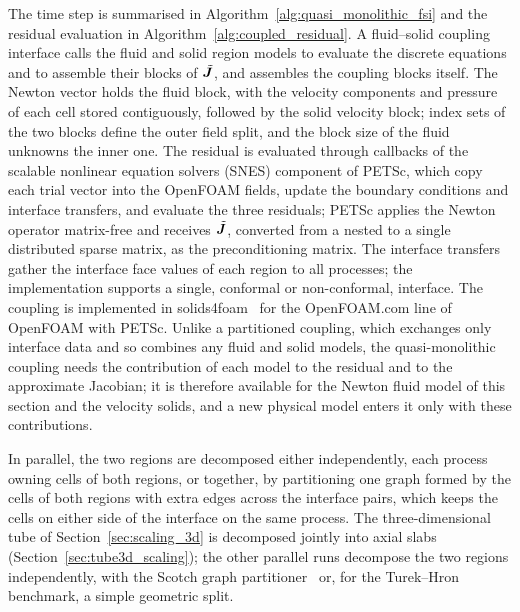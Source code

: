 The time step is summarised in Algorithm~\ref{alg:quasi_monolithic_fsi} and the residual evaluation in Algorithm~\ref{alg:coupled_residual}.
A fluid--solid coupling interface calls the fluid and solid region models to evaluate the discrete equations and to assemble their blocks of $\tilde{\boldsymbol{J}}$, and assembles the coupling blocks itself.
The Newton vector holds the fluid block, with the velocity components and pressure of each cell stored contiguously, followed by the solid velocity block; index sets of the two blocks define the outer field split, and the block size of the fluid unknowns the inner one.
The residual is evaluated through callbacks of the scalable nonlinear equation solvers (SNES) component of PETSc, which copy each trial vector into the OpenFOAM fields, update the boundary conditions and interface transfers, and evaluate the three residuals; PETSc applies the Newton operator matrix-free and receives $\tilde{\boldsymbol{J}}$, converted from a nested to a single distributed sparse matrix, as the preconditioning matrix.
The interface transfers gather the interface face values of each region to all processes; the implementation supports a single, conformal or non-conformal, interface.
The coupling is implemented in solids4foam~\citep{Cardiff2025} for the OpenFOAM.com line of OpenFOAM with PETSc.
Unlike a partitioned coupling, which exchanges only interface data and so combines any fluid and solid models, the quasi-monolithic coupling needs the contribution of each model to the residual and to the approximate Jacobian; it is therefore available for the Newton fluid model of this section and the velocity solids, and a new physical model enters it only with these contributions.

In parallel, the two regions are decomposed either independently, each process owning cells of both regions, or together, by partitioning one graph formed by the cells of both regions with extra edges across the interface pairs, which keeps the cells on either side of the interface on the same process.
The three-dimensional tube of Section~\ref{sec:scaling_3d} is decomposed jointly into axial slabs (Section~\ref{sec:tube3d_scaling}); the other parallel runs decompose the two regions independently, with the Scotch graph partitioner~\citep{Pellegrini2012} or, for the Turek--Hron benchmark, a simple geometric split.

